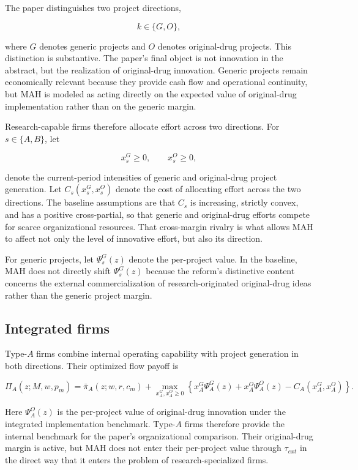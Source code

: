 \documentclass[12pt]{article}
\begin{document}
The paper distinguishes two project directions,

\[
k\in\{G,O\},
\]

where $G$ denotes generic projects and $O$ denotes original-drug projects. This distinction is
substantive. The paper's final object is not innovation in the abstract, but the realization of
original-drug innovation. Generic projects remain economically relevant because they provide
cash flow and operational continuity, but MAH is modeled as acting directly on the expected
value of original-drug implementation rather than on the generic margin.

Research-capable firms therefore allocate effort across two directions. For $s\in\{A,B\}$, let

\[
x_s^G\ge 0,\qquad x_s^O\ge 0,
\]

denote the current-period intensities of generic and original-drug project generation. Let
$C_s(x_s^G,x_s^O)$ denote the cost of allocating effort across the two directions. The baseline
assumptions are that $C_s$ is increasing, strictly convex, and has a positive cross-partial,
so that generic and original-drug efforts compete for scarce organizational resources. That
cross-margin rivalry is what allows MAH to affect not only the level of innovative effort, but
also its direction.

For generic projects, let $\Psi_s^G(z)$ denote the per-project value. In the baseline, MAH does
not directly shift $\Psi_s^G(z)$ because the reform's distinctive content concerns the external
commercialization of research-originated original-drug ideas rather than the generic project
margin.

\subsection{Integrated firms}

Type-$A$ firms combine internal operating capability with project generation in both directions.
Their optimized flow payoff is

\begin{equation}
\Pi_A(z;M,w,p_m)=\bar{\pi}_A(z;w,r,c_m)+
\max_{x_A^G,x_A^O\ge 0}\left\{x_A^G\Psi_A^G(z)+x_A^O\Psi_A^O(z)-C_A(x_A^G,x_A^O)\right\}.
\end{equation}

Here $\Psi_A^O(z)$ is the per-project value of original-drug innovation under the integrated
implementation benchmark. Type-$A$ firms therefore provide the internal benchmark for the
paper's organizational comparison. Their original-drug margin is active, but MAH does not
enter their per-project value through $\tau_{ext}$ in the direct way that it enters the problem of
research-specialized firms.
\end{document}
